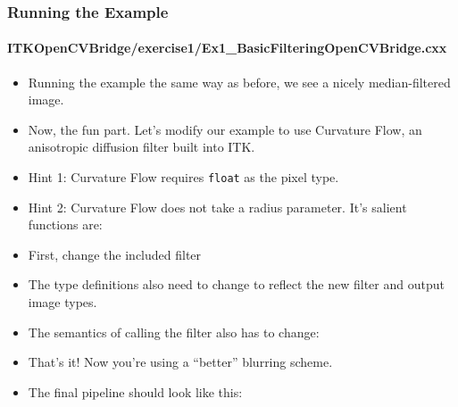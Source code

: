 \begin{frame}
\frametitle{Running the Example}
\framesubtitle{ITKOpenCVBridge/exercise1/Ex1\_BasicFilteringOpenCVBridge.cxx}
\begin{itemize}
\item Running the example the same way as before, we see a nicely
median-filtered image.
\pause
\item Now, the fun part. Let's modify our example to use Curvature Flow, an
anisotropic diffusion filter built into ITK.
\end{itemize}
\end{frame}

\begin{frame}
\begin{itemize}
\frametitle{Exercise 1}
\framesubtitle{ITKOpenCVBridge/exercise1/Ex1\_BasicFilteringOpenCVBridge.cxx}
\item Hint 1: Curvature Flow requires {\tt float} as the pixel
  type.
\pause
\item Hint 2: Curvature Flow does not take a radius parameter. It's
  salient functions are:
\end{itemize}
\end{frame}

\begin{frame}
\begin{itemize}
\frametitle{Exercise 1 (Answer)}
\framesubtitle{ITKOpenCVBridge/exercise1/Ex1\_BasicFilteringOpenCVBridgeAnswer.cxx}
\item First, change the included filter
\pause
\item The type definitions also need to change to reflect the new
  filter and output image types.
\end{itemize}
\end{frame}

\begin{frame}
\begin{itemize}
\frametitle{Exercise 1 (Answer)}
\framesubtitle{ITKOpenCVBridge/exercise1/Ex1\_BasicFilteringOpenCVBridgeAnswer.cxx}
\item The semantics of calling the filter also has to change:
\pause
\item That's it! Now you're using a ``better'' blurring scheme.
\end{itemize}
\end{frame}

\begin{frame}
\begin{itemize}
\frametitle{Exercise 1 (Answer)}
\framesubtitle{ITKOpenCVBridge/exercise1/Ex1\_BasicFilteringOpenCVBridgeAnswer.cxx}
\item The final pipeline should look like this:
\end{itemize}
\end{frame}
